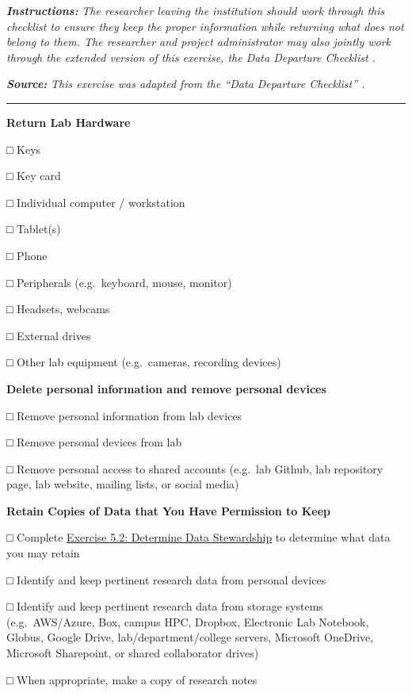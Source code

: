 \documentclass[
]{book}
\begin{document}
\textbf{\emph{Instructions:}} \emph{The researcher leaving the institution should work through this checklist to ensure they keep the proper information while returning what does not belong to them. The researcher and project administrator may also jointly work through the extended version of this exercise, the Data Departure Checklist \citep{goben_data_2023}.}

\textbf{\emph{Source:}} \emph{This exercise was adapted from the ``Data Departure Checklist'' \citep{goben_data_2023}.}

\begin{center}\rule{0.5\linewidth}{0.5pt}\end{center}

\textbf{Return Lab Hardware}

□ Keys

□ Key card

□ Individual computer / workstation

□ Tablet(s)

□ Phone

□ Peripherals (e.g.~keyboard, mouse, monitor)

□ Headsets, webcams

□ External drives

□ Other lab equipment (e.g.~cameras, recording devices)

\textbf{Delete personal information and remove personal devices}

□ Remove personal information from lab devices

□ Remove personal devices from lab

□ Remove personal access to shared accounts (e.g.~lab Github, lab repository page, lab website, mailing lists, or social media)

\textbf{Retain Copies of Data that You Have Permission to Keep}

□ Complete \protect\hyperlink{data-governance}{Exercise 5.2: Determine Data Stewardship} to determine what data you may retain

□ Identify and keep pertinent research data from personal devices

□ Identify and keep pertinent research data from storage systems (e.g.~AWS/Azure, Box, campus HPC, Dropbox, Electronic Lab Notebook, Globus, Google Drive, lab/department/college servers, Microsoft OneDrive, Microsoft Sharepoint, or shared collaborator drives)

□ When appropriate, make a copy of research notes
\end{document}
